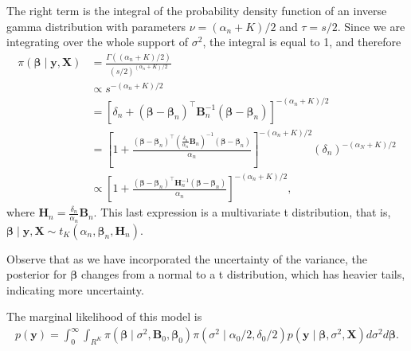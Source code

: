 The right term is the integral of the probability density function of an inverse gamma distribution with parameters $\nu = (\alpha_n+K)/2$ and $\tau = s/2$. Since we are integrating over the whole support of $\sigma^2$, the integral is equal to 1, and therefore
\begin{align*}
	\pi(\bm{\beta}\mid {\bm{y}},{\bm{X}}) & = \frac{\Gamma((\alpha_n+K)/2)}{(s/2)^{(\alpha_n+K)/2}} \\
	& \propto s^{-(\alpha_n+K)/2} \\
	& = [\delta_n + (\bm{\beta} - \bm{\beta}_n)^{\top}{{\bm{B}}}_n^{-1}(\bm{\beta} - \bm{\beta}_n)]^{-(\alpha_n+K)/2} \\
	& = \left[1 + \frac{(\bm{\beta} - \bm{\beta}_n)^{\top}\left(\frac{\delta_n}{\alpha_n}{{\bm{B}}}_n\right)^{-1}(\bm{\beta} - \bm{\beta}_n)}{\alpha_n}\right]^{-(\alpha_n+K)/2}(\delta_n)^{-(\alpha_N+K)/2} \\
	& \propto \left[1 + \frac{(\bm{\beta} - \bm{\beta}_n)^{\top}{\bm{H}}_n^{-1}(\bm{\beta} - \bm{\beta}_n)}{\alpha_n}\right]^{-(\alpha_n+K)/2},
\end{align*}
where ${\bm{H}}_n = \frac{\delta_n}{\alpha_n}{\bm{B}}_n$. This last expression is a multivariate t distribution, that is, $\bm{\beta}\mid {\bm{y}},{\bm{X}} \sim t_K(\alpha_n, \bm{\beta}_n, {\bm{H}}_n)$.

Observe that as we have incorporated the uncertainty of the variance, the posterior for $\bm{\beta}$ changes from a normal to a t distribution, which has heavier tails, indicating more uncertainty. 

The marginal likelihood of this model is
\begin{align*}
	p({\bm{y}})=\int_0^{\infty}\int_{R^K}\pi (\bm{\beta} \mid  \sigma^2,{\bm{B}}_0,\bm{\beta}_0 )\pi(\sigma^2\mid  \alpha_0/2, \delta_0/2)p({\bm{y}}\mid \bm{\beta}, \sigma^2, {\bm{X}})d\sigma^2 d\bm{\beta}.
\end{align*}

